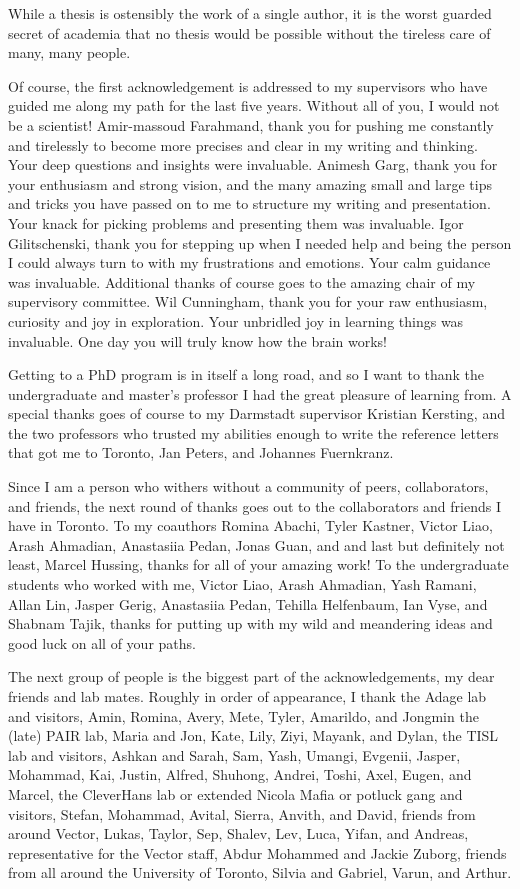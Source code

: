 While a thesis is ostensibly the work of a single author, it is the worst guarded secret of academia that no thesis would be possible without the tireless care of many, many people.

Of course, the first acknowledgement is addressed to my supervisors who have guided me along my path for the last five years.
Without all of you, I would not be a scientist!
Amir-massoud Farahmand, thank you for pushing me constantly and tirelessly to become more precises and clear in my writing and thinking.
Your deep questions and insights were invaluable.
Animesh Garg, thank you for your enthusiasm and strong vision, and the many amazing small and large tips and tricks you have passed on to me to structure my writing and presentation.
Your knack for picking problems and presenting them was invaluable.
Igor Gilitschenski, thank you for stepping up when I needed help and being the person I could always turn to with my frustrations and emotions.
Your calm guidance was invaluable.
Additional thanks of course goes to the amazing chair of my supervisory committee.
Wil Cunningham, thank you for your raw enthusiasm, curiosity and joy in exploration.
Your unbridled joy in learning things was invaluable.
One day you will truly know how the brain works!

Getting to a PhD program is in itself a long road, and so I want to thank the undergraduate and master's professor I had the great pleasure of learning from.
A special thanks goes of course to my Darmstadt supervisor Kristian Kersting, and the two professors who trusted my abilities enough to write the reference letters that got me to Toronto, Jan Peters, and Johannes Fuernkranz.

Since I am a person who withers without a community of peers, collaborators, and friends, the next round of thanks goes out to the collaborators and friends I have in Toronto.
To my coauthors Romina Abachi, Tyler Kastner, Victor Liao, Arash Ahmadian, Anastasiia Pedan, Jonas Guan, and and last but definitely not least, Marcel Hussing, thanks for all of your amazing work!
To the undergraduate students who worked with me, Victor Liao, Arash Ahmadian, Yash Ramani, Allan Lin, Jasper Gerig, Anastasiia Pedan, Tehilla Helfenbaum, Ian Vyse, and Shabnam Tajik, thanks for putting up with my wild and meandering ideas and good luck on all of your paths.

The next group of people is the biggest part of the acknowledgements, my dear friends and lab mates.
Roughly in order of appearance, I thank
the Adage lab and visitors, Amin, Romina, Avery, Mete, Tyler, Amarildo, and Jongmin the (late) PAIR lab, Maria and Jon, Kate, Lily, Ziyi, Mayank, and Dylan, the TISL lab and visitors, Ashkan and Sarah, Sam, Yash, Umangi, Evgenii, Jasper, Mohammad, Kai, Justin, Alfred, Shuhong, Andrei, Toshi, Axel, Eugen, and Marcel, the CleverHans lab or extended Nicola Mafia or potluck gang and visitors, Stefan, Mohammad, Avital, Sierra, Anvith, and David, friends from around Vector, Lukas, Taylor, Sep, Shalev, Lev, Luca, Yifan, and Andreas, representative for the Vector staff, Abdur Mohammed and Jackie Zuborg, friends from all around the University of Toronto, Silvia and Gabriel, Varun, and Arthur.

